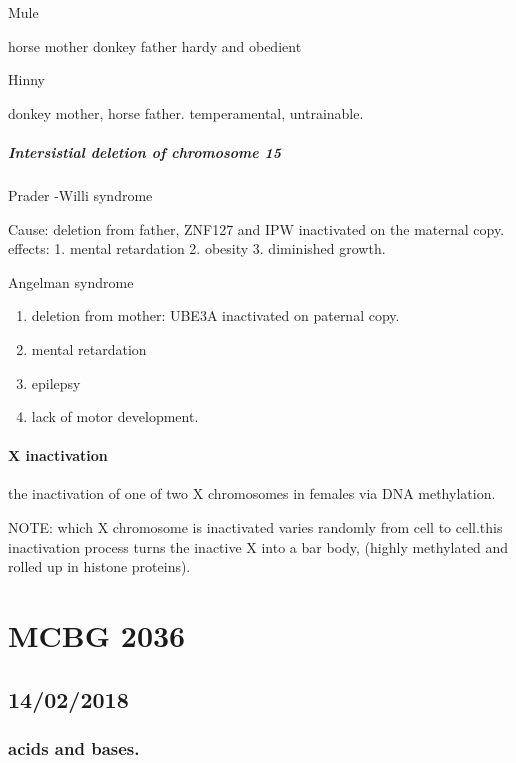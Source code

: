 \documentclass[]{article}
\providecommand{\tightlist}{%
  \setlength{\itemsep}{0pt}\setlength{\parskip}{0pt}}
\let\oldparagraph\paragraph
\renewcommand{\paragraph}[1]{\oldparagraph{#1}\mbox{}}
\let\oldsubparagraph\subparagraph
\renewcommand{\subparagraph}[1]{\oldsubparagraph{#1}\mbox{}}
\begin{document}
Mule

horse mother donkey father hardy and obedient

Hinny

donkey mother, horse father. temperamental, untrainable.

\hypertarget{intersistial-deletion-of-chromosome-15}{%
\subparagraph{Intersistial deletion of chromosome
15}\label{intersistial-deletion-of-chromosome-15}}

Prader -Willi syndrome

Cause: deletion from father, ZNF127 and IPW inactivated on the maternal
copy.\\
effects: 1. mental retardation 2. obesity 3. diminished growth.

Angelman syndrome

\begin{enumerate}
\def\labelenumi{\arabic{enumi}.}
\tightlist
\item
  deletion from mother: UBE3A inactivated on paternal copy.\\
\item
  mental retardation
\item
  epilepsy
\item
  lack of motor development.
\end{enumerate}

\hypertarget{x-inactivation}{%
\paragraph{X inactivation}\label{x-inactivation}}

the inactivation of one of two X chromosomes in females via DNA
methylation.

NOTE: which X chromosome is inactivated varies randomly from cell to
cell.this inactivation process turns the inactive X into a bar body,
(highly methylated and rolled up in histone proteins).

\hypertarget{mcbg-2036}{%
\section{MCBG 2036}\label{mcbg-2036}}

\hypertarget{section-1}{%
\subsection{14/02/2018}\label{section-1}}

\hypertarget{acids-and-bases.}{%
\subsubsection{acids and bases.}\label{acids-and-bases.}}
\end{document}
